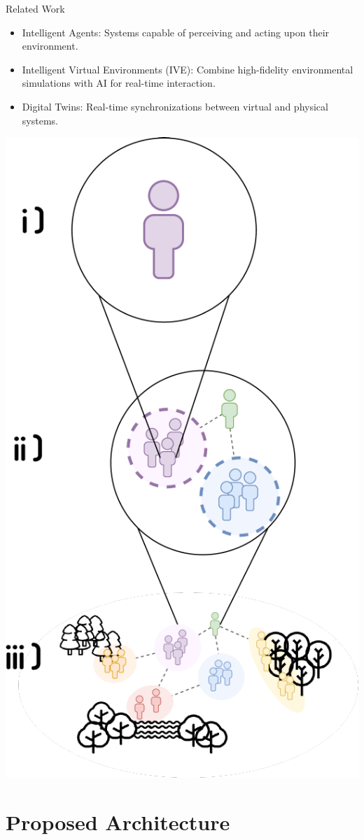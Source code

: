 \begin{frame}{Related Work}
    \begin{multicols}{2}
        \begin{itemize}
            \item \alert{Intelligent Agents}: Systems capable of perceiving and acting upon their environment.
            \item \alert{Intelligent Virtual Environments (IVE)}: Combine high-fidelity environmental simulations with AI for real-time interaction.
            \item \alert{Digital Twins}: Real-time synchronizations between virtual and physical systems.
        \end{itemize}

        \columnbreak

        \centering
        \includegraphics[width=0.5\linewidth]{Documents/240918 CECIIS @ UNIZG FOI/Figures/Agent_MAS_IVE.pdf}
    \end{multicols}
\end{frame}

\section{Proposed Architecture}

